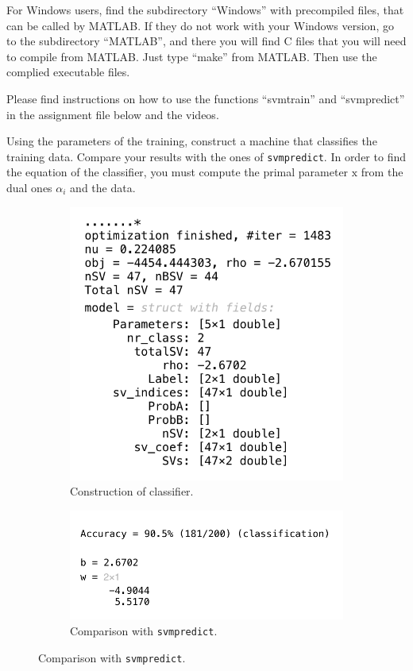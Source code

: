 \documentclass[11pt]{article}
\begin{document}
For Windows users, find the subdirectory ``Windows'' with precompiled files, that can be called by MATLAB. If they do not work with your Windows version, go to the subdirectory ``MATLAB'', and there you will find C files that you will need to compile from MATLAB. Just type ``make'' from MATLAB. Then use the complied executable files.

Please find instructions on how to use the functions ``svmtrain'' and ``svmpredict'' in the assignment file below and the videos.

\begin{tcolorbox}[colback=CrispBlue!5!white,colframe=CrispBlue!75!black,title=3.1 Construction of a classifier with the model parameters.]
Using the parameters of the training, construct a machine that classifies the training data. Compare your results with the ones of \texttt{svmpredict}. In order to find the equation of the classifier, you must compute the primal parameter \( \bm{\mathrm{x}} \) from the dual ones \( \alpha_i \) and the data.
\end{tcolorbox}
\begin{figure}[h]
    \begin{subfigure}{0.5\textwidth}
    \includegraphics[width=0.8\linewidth]{modelParam.png}
    \caption{Construction of classifier.}
    \label{fig:Param}
    \end{subfigure}
    \begin{subfigure}{0.6\textwidth}\hspace{1em}
    \includegraphics[width=0.8\linewidth]{svmpredict.png}
    \vspace{8.8em}\caption{Comparison with \texttt{svmpredict}.}
    \label{fig:svmPredict}
    \end{subfigure}
\end{figure}
\end{document}
